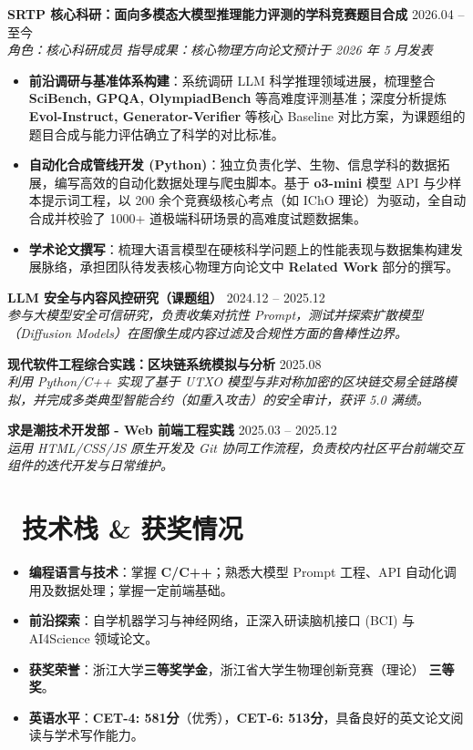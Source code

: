\documentclass[11pt]{article}
\begin{document}
\textbf{SRTP 核心科研：面向多模态大模型推理能力评测的学科竞赛题目合成} \hfill 2026.04 -- 至今 \\
\textit{角色：核心科研成员 \hfill 指导成果：核心物理方向论文预计于 2026 年 5 月发表}
\begin{itemize}[nosep]
    \item \textbf{前沿调研与基准体系构建}：系统调研 LLM 科学推理领域进展，梳理整合 \textbf{SciBench, GPQA, OlympiadBench} 等高难度评测基准；深度分析提炼 \textbf{Evol-Instruct, Generator-Verifier} 等核心 Baseline 对比方案，为课题组的题目合成与能力评估确立了科学的对比标准。
    \item \textbf{自动化合成管线开发 (Python)}：独立负责化学、生物、信息学科的数据拓展，编写高效的自动化数据处理与爬虫脚本。基于 \textbf{o3-mini} 模型 API 与少样本提示词工程，以 200 余个竞赛级核心考点（如 IChO 理论）为驱动，全自动合成并校验了 1000+ 道极端科研场景的高难度试题数据集。
    \item \textbf{学术论文撰写}：梳理大语言模型在硬核科学问题上的性能表现与数据集构建发展脉络，承担团队待发表核心物理方向论文中 \textbf{Related Work} 部分的撰写。
\end{itemize}

\vspace{0.6em}
\textbf{LLM 安全与内容风控研究（课题组）} \hfill 2024.12 -- 2025.12 \\
\textit{参与大模型安全可信研究，负责收集对抗性 Prompt，测试并探索扩散模型（Diffusion Models）在图像生成内容过滤及合规性方面的鲁棒性边界。}

\vspace{0.6em}
\textbf{现代软件工程综合实践：区块链系统模拟与分析} \hfill 2025.08 \\
\textit{利用 Python/C++ 实现了基于 UTXO 模型与非对称加密的区块链交易全链路模拟，并完成多类典型智能合约（如重入攻击）的安全审计，获评 5.0 满绩。}

\vspace{0.6em}
\textbf{求是潮技术开发部 - Web 前端工程实践} \hfill 2025.03 -- 2025.12 \\
\textit{运用 HTML/CSS/JS 原生开发及 Git 协同工作流程，负责校内社区平台前端交互组件的迭代开发与日常维护。}

\section{\faCogs\ 技术栈 \& 获奖情况}
\begin{itemize}[nosep]
    \item \textbf{编程语言与技术}：掌握 \textbf{C/C++}；熟悉大模型 Prompt 工程、API 自动化调用及数据处理；掌握一定前端基础。
    \item \textbf{前沿探索}：自学机器学习与神经网络，正深入研读脑机接口 (BCI) 与 AI4Science 领域论文。
    \item \textbf{获奖荣誉}：浙江大学\textbf{三等奖学金}，浙江省大学生物理创新竞赛（理论） \textbf{三等奖}。
    \item \textbf{英语水平}：\textbf{CET-4: 581分}（优秀），\textbf{CET-6: 513分}，具备良好的英文论文阅读与学术写作能力。
\end{itemize}
\end{document}
